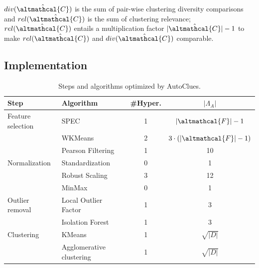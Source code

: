 \noindent $div(\hat{\altmathcal{C}})$ is the sum of pair-wise clustering diversity comparisons and $rel(\hat{\altmathcal{C}})$ is the sum of clustering relevance;
$rel(\hat{\altmathcal{C}})$ entails a multiplication factor $|\hat{\altmathcal{C}}|-1$ to make $rel(\hat{\altmathcal{C}})$ and $div(\hat{\altmathcal{C}})$ comparable.


\subsection{Implementation}\label{clustering-sec:implementation}

\begin{table}[t]
    \centering
    \begin{tabular}{llcc}
        \hline
        Step     & Algorithm & \#Hyper. & $|\Lambda_A|$\\\hline
        Feature selection & SPEC \cite{zhao2007spectral} & 1 & $|\altmathcal{F}|-1$\\
         & WKMeans \cite{WKMeans} & 2 & $3 \cdot (|\altmathcal{F}|-1)$\\
         & Pearson Filtering & 1 & 10\\
        Normalization     & Standardization & 0 & 1\\
        & Robust Scaling & 3 & 12\\
        & MinMax & 0 & 1\\
        Outlier removal   & Local Outlier Factor \cite{breunig2000lof} & 1 & 3\\
        & Isolation Forest \cite{liu2012isolation} & 1 & 3\\
        Clustering  & KMeans \cite{arthur2006k} & 1 & $\sqrt{|D|}$\\
        & Agglomerative clustering  \cite{murtagh2017algorithms} & 1 & $\sqrt{|D|}$\\\hline
    \end{tabular}
    \vspace{0.2cm}
    \caption{Steps and algorithms optimized by AutoClues.}
    \label{clustering-tbl:processing}
\end{table}



